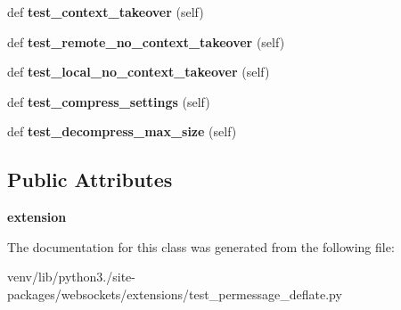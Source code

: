 \begin{DoxyCompactItemize}
def {\bfseries test\+\_\+context\+\_\+takeover} (self)
\item 
\mbox{\label{classwebsockets_1_1extensions_1_1test__permessage__deflate_1_1_per_message_deflate_tests_a8b2002f1cc1e70f5b6595c92998a1106}} 
def {\bfseries test\+\_\+remote\+\_\+no\+\_\+context\+\_\+takeover} (self)
\item 
\mbox{\label{classwebsockets_1_1extensions_1_1test__permessage__deflate_1_1_per_message_deflate_tests_abfa2925560d37ca567de156ab9bc2aee}} 
def {\bfseries test\+\_\+local\+\_\+no\+\_\+context\+\_\+takeover} (self)
\item 
\mbox{\label{classwebsockets_1_1extensions_1_1test__permessage__deflate_1_1_per_message_deflate_tests_a1a9b8094db4abd7d9467b932c8fd3782}} 
def {\bfseries test\+\_\+compress\+\_\+settings} (self)
\item 
\mbox{\label{classwebsockets_1_1extensions_1_1test__permessage__deflate_1_1_per_message_deflate_tests_a8a656046c5a7d15def5e891704062560}} 
def {\bfseries test\+\_\+decompress\+\_\+max\+\_\+size} (self)
\end{DoxyCompactItemize}
\subsection*{Public Attributes}
\begin{DoxyCompactItemize}
\item 
\mbox{\label{classwebsockets_1_1extensions_1_1test__permessage__deflate_1_1_per_message_deflate_tests_a5190883af724fa18d26a06dfa016393f}} 
{\bfseries extension}
\end{DoxyCompactItemize}


The documentation for this class was generated from the following file\+:\begin{DoxyCompactItemize}
\item 
venv/lib/python3./site-\/packages/websockets/extensions/test\+\_\+permessage\+\_\+deflate.\+py\end{DoxyCompactItemize}
